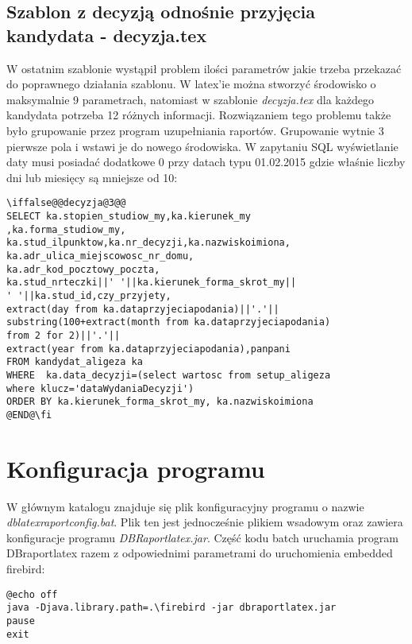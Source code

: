 \subsection*{Szablon z decyzją odnośnie przyjęcia kandydata - decyzja.tex}
W ostatnim szablonie wystąpił problem ilości parametrów jakie trzeba przekazać do poprawnego działania szablonu. W latex'ie można stworzyć środowisko o maksymalnie 9 parametrach, natomiast w szablonie \emph{decyzja.tex} dla każdego kandydata potrzeba 12 różnych informacji. Rozwiązaniem tego problemu także było grupowanie przez program uzupełniania raportów. Grupowanie wytnie 3 pierwsze pola i wstawi je do nowego środowiska. W zapytaniu SQL wyświetlanie daty musi posiadać dodatkowe 0 przy datach typu 01.02.2015 gdzie właśnie liczby dni lub miesięcy są mniejsze od 10:
 \begin{lstlisting}
\iffalse@@decyzja@3@@
SELECT ka.stopien_studiow_my,ka.kierunek_my
,ka.forma_studiow_my,
ka.stud_ilpunktow,ka.nr_decyzji,ka.nazwiskoimiona,
ka.adr_ulica_miejscowosc_nr_domu,
ka.adr_kod_pocztowy_poczta,
ka.stud_nrteczki||' '||ka.kierunek_forma_skrot_my||
' '||ka.stud_id,czy_przyjety,
extract(day from ka.dataprzyjeciapodania)||'.'||
substring(100+extract(month from ka.dataprzyjeciapodania)
from 2 for 2)||'.'||
extract(year from ka.dataprzyjeciapodania),panpani
FROM kandydat_aligeza ka 
WHERE  ka.data_decyzji=(select wartosc from setup_aligeza 
where klucz='dataWydaniaDecyzji')
ORDER BY ka.kierunek_forma_skrot_my, ka.nazwiskoimiona
@END@\fi
\end{lstlisting}

\section{Konfiguracja programu}

W głównym katalogu znajduje się plik konfiguracyjny programu o nazwie  \emph{dblatexraportconfig.bat}. Plik ten jest jednocześnie plikiem wsadowym oraz zawiera konfiguracje programu \emph{DBRaportlatex.jar}. Część kodu batch uruchamia program DBraportlatex razem z odpowiednimi parametrami do uruchomienia embedded firebird:
 \begin{lstlisting}
@echo off
java -Djava.library.path=.\firebird -jar dbraportlatex.jar
pause
exit
\end{lstlisting}

